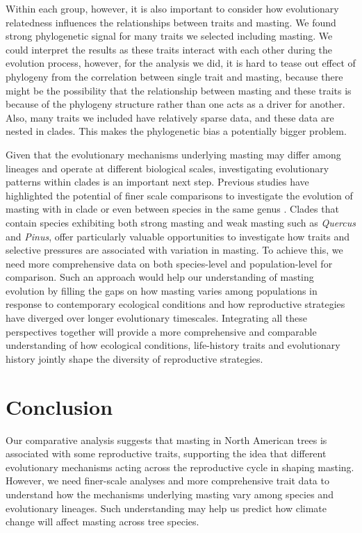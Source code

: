 \documentclass{article}
\begin{document}
Within each group, however, it is also important to consider how evolutionary relatedness influences the relationships between traits and masting. We found strong phylogenetic signal for many traits we selected including masting. We could interpret the results as these traits interact with each other during the evolution process, however, for the analysis we did, it is hard to tease out effect of phylogeny from the correlation between single trait and masting, because there might be the possibility that the relationship between masting and these traits is because of the phylogeny structure rather than one acts as a driver for another. Also, many traits we included have relatively sparse data, and these data are nested in clades. This makes the phylogenetic bias a potentially bigger problem.

Given that the evolutionary mechanisms underlying masting may differ among lineages and operate at different biological scales, investigating evolutionary patterns within clades is an important next step. Previous studies have highlighted the potential of finer scale comparisons to investigate the evolution of masting with in clade or even between species in the same genus \citep{satake2021studying, koenig1996acorn, bogdziewicz2025dynamics}. Clades that contain species exhibiting both strong masting and weak masting such as \textit{Quercus} and \textit{Pinus}, offer particularly valuable opportunities to investigate how traits and selective pressures are associated with variation in masting. To achieve this, we need more comprehensive data on both species-level and population-level for comparison. Such an approach would help our understanding of masting evolution by filling the gaps on how masting varies among populations in response to contemporary ecological conditions and how reproductive strategies have diverged over longer evolutionary timescales. Integrating all these perspectives together will provide a more comprehensive and comparable understanding of how ecological conditions, life-history traits and evolutionary history jointly shape the diversity of reproductive strategies.

\section{Conclusion}
Our comparative analysis suggests that masting in North American trees is associated with some reproductive traits, supporting the idea that different evolutionary mechanisms acting across the reproductive cycle in shaping masting. However, we need finer-scale analyses and more comprehensive trait data to understand how the mechanisms underlying masting vary among species and evolutionary lineages. Such understanding may help us predict how climate change will affect masting across tree species.
\end{document}
